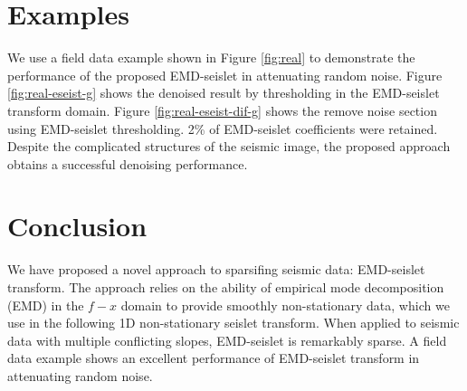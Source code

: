 

\section{Examples}
We use a field data example shown in Figure \ref{fig:real} to demonstrate the performance of the proposed EMD-seislet in attenuating random noise. Figure \ref{fig:real-eseist-g} shows the denoised result by thresholding in the EMD-seislet transform domain. Figure \ref{fig:real-eseist-dif-g} shows the remove noise section using EMD-seislet thresholding. 2\% of EMD-seislet coefficients were retained. Despite the complicated structures of the seismic image, the proposed approach obtains a successful denoising performance.


\section{Conclusion}
We have proposed a novel approach to sparsifing seismic data: EMD-seislet transform. The approach relies on the ability of empirical mode decomposition (EMD) in the $f-x$ domain to provide smoothly non-stationary data, which we use in the following 1D non-stationary seislet transform. When applied to seismic data with multiple conflicting slopes, EMD-seislet is remarkably sparse. A field data example shows an excellent performance of EMD-seislet transform in attenuating random noise.


